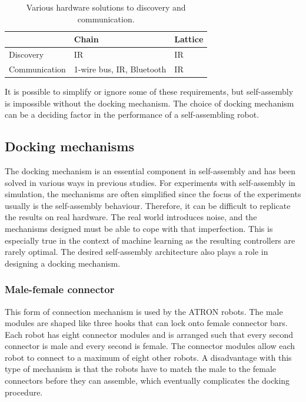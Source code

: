 \begin{table}[H]
	\centering
	\caption{Various hardware solutions to discovery and communication.}
	\begin{tabular}{ @{}  l  l  l  @{}}
		\toprule
		& Chain                         & Lattice \\
		\midrule
		Discovery         & IR\cite{castano_conro:_2000}  & IR\cite{gilpin_miche:_2008} \\
		Communication     & 1-wire bus\cite{zykov_molecubes:_2007}, IR\cite{castano_conro:_2000}, Bluetooth{\cite{mockel_yamor_2006}} & IR\cite{brandt_atron_2007, gilpin_miche:_2008}  \\ \bottomrule
	\end{tabular}
	
	\label{tab:hardware-mechanisms}
\end{table}    

It is possible to simplify or ignore some of these requirements, but self-assembly is impossible without the docking mechanism.
The choice of docking mechanism can be a deciding factor in the performance of a self-assembling robot.


\subsection{Docking mechanisms}
\label{sec:mechanisms}
The docking mechanism is an essential component in self-assembly and has been solved in various ways in previous studies.
For experiments with self-assembly in simulation, the mechanisms are often simplified since the focus of the experiments usually is the self-assembly behaviour.
Therefore, it can be difficult to replicate the results on real hardware.
The real world introduces noise, and the mechanisms designed must be able to cope with that imperfection.
This is especially true in the context of machine learning as the resulting controllers are rarely optimal.
The desired self-assembly architecture also plays a role in designing a docking mechanism.

\subsubsection*{Male-female connector}
This form of connection mechanism is used by the ATRON\cite{brandt_atron_2007} robots.
The male modules are shaped like three hooks that can lock onto female connector bars.
Each robot has eight connector modules and is arranged such that every second connector is male and every second is female.
The connector modules allow each robot to connect to a maximum of eight other robots.
A disadvantage with this type of mechanism is that the robots have to match the male to the female connectors before they can assemble, which eventually complicates the docking procedure.
